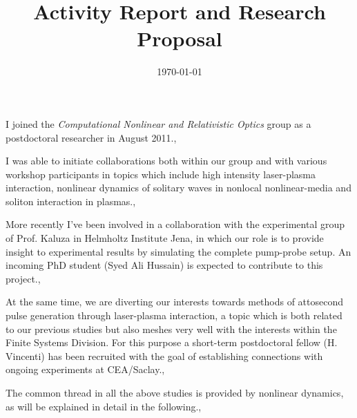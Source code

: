 \documentclass[11pt,a4paper,final]{moderncv}
\title{\large{Activity Report and Research Proposal}}               %
\date{\today}
\begin{document}
\maketitle


I joined the \emph{Computational Nonlinear and Relativistic Optics} group as a postdoctoral researcher in August 2011.\sep

I was able to initiate collaborations both within our group and with various workshop participants in topics which include
high intensity laser-plasma interaction, nonlinear dynamics of solitary waves in nonlocal nonlinear-media and soliton interaction
in plasmas.\sep

More recently I've been involved in a collaboration with the experimental group of Prof. Kaluza in Helmholtz Institute Jena, 
in which our role is to provide insight to experimental results by simulating the complete pump-probe setup. An incoming 
PhD student (Syed Ali Hussain) is expected to contribute to this project.\sep

At the same time, we are diverting our interests towards methods of attosecond pulse generation through laser-plasma interaction,
a topic which is both related to our previous studies but also meshes very well with the interests within the Finite Systems Division.
For this purpose a short-term postdoctoral fellow (H. Vincenti) has been recruited with the goal of establishing connections 
with ongoing experiments at CEA/Saclay.\sep

The common thread in all the above studies is provided by nonlinear dynamics, as will be explained in detail in the following.\sep
\end{document}
